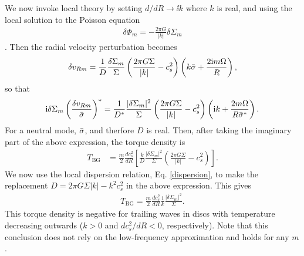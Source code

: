 We now invoke local theory by setting $d/dR \to \ii k$ where $k$ is
real, and using the local solution to the Poisson equation
\begin{align}
  \delta\Phi_m = -\frac{2\pi G}{|k|}\delta\Sigma_m 
\end{align}
\citep{shu91}. Then the radial velocity perturbation becomes
\begin{align}
  \delta v_{Rm} =
  \frac{1}{D}\frac{\delta\Sigma_m}{\Sigma}\left(\frac{2\pi G
      \Sigma}{|k|} - c_s^2\right)\left(k\bar{\sigma} + \frac{2\mathrm{i}
      m\Omega}{R}\right),
\end{align}
so that 
\begin{align}
  \mathrm{i}\delta\Sigma_m \left(\frac{\delta v_{Rm}}{\bar{\sigma}}\right)^* =
  \frac{1}{D^*}\frac{|\delta\Sigma_m|^2}{\Sigma}\left(\frac{2\pi G
      \Sigma}{|k|} - c_s^2\right)\left(\mathrm{i} k  + \frac{2
      m\Omega}{R\bar{\sigma}^*}\right). 
\end{align}
For a neutral mode, $\bar{\sigma}$, and therfore $D$ is real. Then, after
taking the imaginary part of the above expression, the torque
density is 
\begin{align}\label{tbg_explicit}
  T_\mathrm{BG} &=
  \frac{m}{2}\frac{dc_s^2}{dR}\left[\frac{k}{D}\frac{|\delta\Sigma_m|^2}{\Sigma}\left(\frac{2\pi G
      \Sigma}{|k|} - c_s^2\right)\right].
\end{align}
We now use the local dispersion relation,
Eq. \ref{dispersion}, to make the replacement $D = 2\pi G \Sigma |k| -
k^2c_s^2$ in the above expression. This gives
\begin{align}\label{tbg_simple}
  T_\mathrm{BG} =
  \frac{m}{2}\frac{dc_s^2}{dR}\frac{1}{k}\frac{|\delta\Sigma_m|^2}{\Sigma}.  
\end{align} 
This torque density is negative for trailing waves in discs with
temperature decreasing outwards ($k>0$ and $dc_s^2/dR<0$,
respectively). Note that this conclusion does not rely on the
low-frequency approximation and holds for any $m$.   

